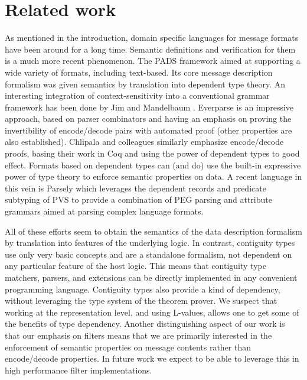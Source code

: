 \documentclass[a4paper,UKenglish,cleveref, autoref, thm-restate]{lipics-v2021}
\begin{document}
\section {Related work}

As mentioned in the introduction, domain specific languages for
message formats have been around for a long time. Semantic definitions
and verification for them is a much more recent phenomenon. The PADS
framework \cite{pads:ddl} aimed at supporting a wide variety of
formats, including text-based. Its core message description formalism
was given semantics by translation into dependent type theory. An
interesting integration of context-sensitivity into a conventional
grammar framework has been done by Jim and Mandelbaum
\cite{trevor-jim-dependent-parsing}. Everparse \cite{everparse} is an
impressive approach, based on parser combinators and having an
emphasis on proving the invertibility of encode/decode pairs with
automated proof (other properties are also established). Chlipala and
colleagues \cite{narcissus-encode-decode} similarly emphasize
encode/decode proofs, basing their work in Coq and using the power of
dependent types to good effect. Formats based on dependent types can
(and do) use the built-in expressive power of type theory to enforce
semantic properties on data. A recent language in this vein is Parsely
\cite{parsley:sri} which leverages the dependent records and predicate
subtyping of PVS to provide a combination of PEG parsing and attribute
grammars aimed at parsing complex language formats.

All of these efforts seem to obtain the semantics of the data
description formalism by translation into features of the underlying
logic. In contrast, contiguity types use only very basic concepts and
are a standalone formalism, not dependent on any particular feature of
the host logic. This means that contiguity type matchers, parsers, and
extensions can be directly implemented in any convenient programming
language.  Contiguity types also provide a kind of dependency, without
leveraging the type system of the theorem prover. We suspect that
working at the representation level, and using L-values, allows one to
get some of the benefits of type dependency. Another distinguishing
aspect of our work is that our emphasis on filters means that we are
primarily interested in the enforcement of semantic properties on
message contents rather than encode/decode properties. In future work
we expect to be able to leverage this in high performance filter
implementations.
\end{document}
